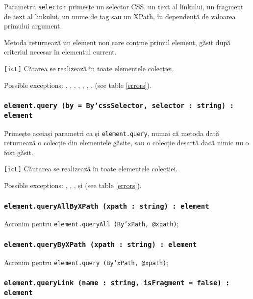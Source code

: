 Parametru \texttt{selector} primește un selector CSS, un text al linkului, un fragment de text al linkului, un nume de tag sau un XPath, în dependență de valoarea primului argument.

Metoda returnează un element nou care conține primul element, găsit după criteriul necesar în elementul current.

\texttt{[icL]} Cătarea se realizează în toate elementele colecției.

Possible exceptions: , , , , , , ,  (see table \ref{errors}).

\subsubsection{\texttt{element.query (by = By'cssSelector, selector : string) : element}}

Primește aceiași parametri ca și \texttt{element.query}, numai că metoda dată returnează o colecție din elementele găsite, sau o colecție deșartă dacă nimic nu o fost găsit.

\texttt{[icL]} Căutarea se realizează în toate elementele colecției.

Possible exceptions: , , ,  și  (see table \ref{errors}).

\subsubsection{\texttt{element.queryAllByXPath (xpath : string) : element}}

Acronim pentru \texttt{element.queryAll (By'xPath, @xpath)};

\subsubsection{\texttt{element.queryByXPath (xpath : string) : element}}

Acronim pentru \texttt{element.query (By'xPath, @xpath)};

\subsubsection{\texttt{element.queryLink (name : string, isFragment = false) : element}}

